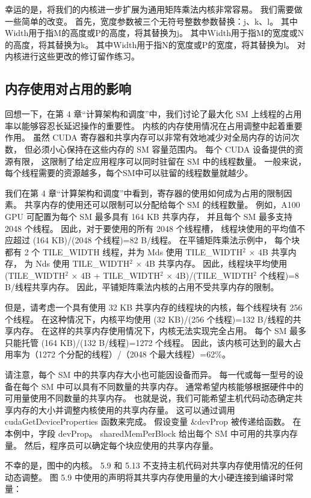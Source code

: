 幸运的是，将我们的内核进一步扩展为通用矩阵乘法内核非常容易。 我们需要做一些简单的改变。 
首先，宽度参数被三个无符号整数参数替换：j、k、l。 其中Width用于指M的高度或P的高度，将其替换为j。 
其中Width用于指M的宽度或N的高度，将其替换为k。 其中Width用于指N的宽度或P的宽度，将其替换为l。 
对内核进行这些更改的修订留作练习。

\subsection{内存使用对占用的影响}
回想一下，在第 4 章“计算架构和调度”中，我们讨论了最大化 SM 上线程的占用率以能够容忍长延迟操作的重要性。 
内核的内存使用情况在占用调整中起着重要作用。 虽然 CUDA 寄存器和共享内存可以非常有效地减少对全局内存的访问次数，
但必须小心保持在这些内存的 SM 容量范围内。 每个 CUDA 设备提供的资源有限，
这限制了给定应用程序可以同时驻留在 SM 中的线程数量。 一般来说，每个线程需要的资源越多，每个SM中可以驻留的线程数量就越少。

我们在第 4 章“计算架构和调度”中看到，寄存器的使用如何成为占用的限制因素。 
共享内存的使用还可以限制可以分配给每个 SM 的线程数量。 例如，A100 GPU 可配置为每个 SM 最多具有 164 KB 共享内存，
并且每个 SM 最多支持 2048 个线程。 因此，对于要使用的所有 2048 个线程槽，
线程块使用的平均值不应超过 (164 KB)/(2048 个线程)=82 B/线程。 在平铺矩阵乘法示例中，
每个块都有 2 个 TILE\_WIDTH 线程，并为 Mds 使用 TILE\_WIDTH$^2$ × 4B 共享内存，
为 Nds 使用 TILE\_WIDTH$^2$ × 4B 共享内存。 
因此，线程块平均使用 (TILE\_WIDTH$^2$ × 4B + TILE\_WIDTH$^2$ × 4B)/(TILE\_WIDTH$^2$ 个线程)=8 B/线程共享内存。 
因此，平铺矩阵乘法内核的占用不受共享内存的限制。

但是，请考虑一个具有使用 32 KB 共享内存的线程块的内核，每个线程块有 256 个线程。 
在这种情况下，内核平均使用 (32 KB)/(256 个线程)=132 B/线程的共享内存。 
在这样的共享内存使用情况下，内核无法实现完全占用。 每个 SM 最多只能托管 (164 KB)/(132 B/线程)=1272 个线程。 
因此，该内核可达到的最大占用率为（1272 个分配的线程）/（2048 个最大线程）=62\%。

请注意，每个 SM 中的共享内存大小也可能因设备而异。 每一代或每一型号的设备在每个 SM 中可以具有不同数量的共享内存。 
通常希望内核能够根据硬件中的可用量使用不同数量的共享内存。 
也就是说，我们可能希望主机代码动态确定共享内存的大小并调整内核使用的共享内存量。 
这可以通过调用 cudaGetDeviceProperties 函数来完成。 假设变量 \&devProp 被传递给函数。 
在本例中，字段 devProp。 sharedMemPerBlock 给出每个 SM 中可用的共享内存量。 
然后，程序员可以确定每个块应使用的共享内存量。

不幸的是，图中的内核。 5.9 和 5.13 不支持主机代码对共享内存使用情况的任何动态调整。 
图 5.9 中使用的声明将其共享内存使用量的大小硬连接到编译时常量：

